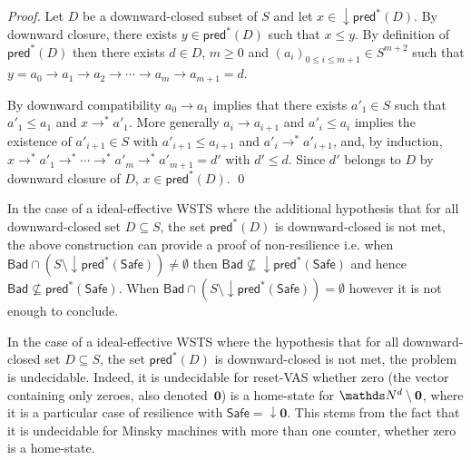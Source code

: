 \documentclass[runningheads]{llncs}
\newcommand{\pred}{\textsf{pred}}
\newcommand{\Bad}{\textsf{Bad}}
\newcommand{\Safe}{\textsf{Safe}}
\begin{document}
\begin{proof}


Let $D$ be a downward-closed subset of $S$
and let $x \in \downarrow \pred^*(D)$.
By downward closure, there exists
$y \in \pred^*(D)$ 
such that $x \leq y$.
By definition of $\pred^*(D)$ then there exists 
$d \in D$, $m\geq 0$ and $(a_i)_{0 \leq i \leq m+1} \in S^{m+2}$ such that
$y = a_0 \to a_1 \to a_2 \to \cdots \to a_m \to a_{m+1} = d$.

By downward compatibility $a_0 \to a_1$
implies that there exists $a'_1 \in S$ such that $a'_1 \leq a_1$ and
$x \to^* a'_1$.
More generally $a_i \to a_{i+1}$ and
$a'_i\leq a_i$ implies the existence of $a'_{i+1} \in S$ with $a'_{i+1} \leq a_{i+1}$ and
$a'_i \to^* a'_{i+1}$,
and, by induction,
 $x \to^* a'_1 \to^* \cdots \to^* a'_{m} \to^* a'_{m+1} = d'$
with $d' \leq d$.
Since
$d'$ 
belongs to $D$ by downward closure of $D$, $x \in \pred^*(D)$. \qed
\end{proof}


In the case
of a ideal-effective WSTS 
where
the additional hypothesis that
for all downward-closed set $D \subseteq S$, the set $\pred^*(D)$ is downward-closed
is not met,
the above construction
can provide a proof
of non-resilience
i.e. when
$\Bad \cap (S \setminus \downarrow\pred^*(\Safe)) \neq \emptyset$
then
$\Bad \not\subseteq \downarrow\pred^*(\Safe)$
and hence
$\Bad \not\subseteq \pred^*(\Safe)$.
When $\Bad \cap (S \setminus \downarrow\pred^*(\Safe)) = \emptyset$
however
it is not enough to conclude.



In the case
of a ideal-effective WSTS 
where the hypothesis that
{for all downward-closed set $D \subseteq S$, the set $\pred^*(D)$ is downward-closed}
is not met, the problem is undecidable.
 Indeed, it is 
undecidable for reset-VAS whether zero (the vector containing only zeroes, also denoted~$ \textbf{0}$) is a home-state for $\N^d \setminus \textbf{0}$, where it is a particular case of resilience with $\Safe = \downarrow \textbf{0}$. This stems from the fact that it is undecidable for Minsky machines with more than one counter, whether zero is a home-state.  
\end{document}
